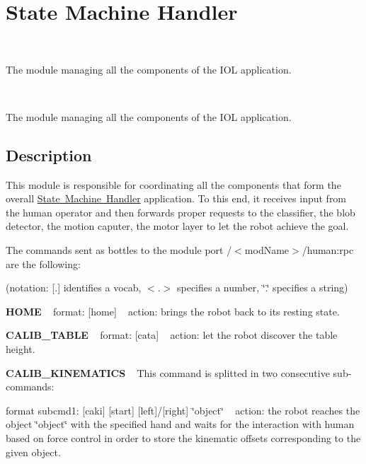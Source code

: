 \section{State Machine Handler}
\label{group__icub__iolStateMachineHandler}


~\newline


The module managing all the components of the I\+OL application.  


~\newline


The module managing all the components of the I\+OL application. 

\hypertarget{group__iolReachingCalibration_intro_sec}{}\subsection{Description}\label{group__iolReachingCalibration_intro_sec}
This module is responsible for coordinating all the components that form the overall \mbox{\hyperlink{group__icub__iolStateMachineHandler}{State Machine Handler}} application. To this end, it receives input from the human operator and then forwards proper requests to the classifier, the blob detector, the motion caputer, the motor layer to let the robot achieve the goal.

The commands sent as bottles to the module port /$<$mod\+Name$>$/human\+:rpc are the following\+:

(notation\+: \mbox{[}.\mbox{]} identifies a vocab, $<$.$>$ specifies a number, \char`\"{}.\char`\"{} specifies a string)

{\bfseries H\+O\+ME} ~\newline
format\+: \mbox{[}home\mbox{]} ~\newline
action\+: brings the robot back to its resting state.

{\bfseries C\+A\+L\+I\+B\+\_\+\+T\+A\+B\+LE} ~\newline
format\+: \mbox{[}cata\mbox{]} ~\newline
action\+: let the robot discover the table height.

{\bfseries C\+A\+L\+I\+B\+\_\+\+K\+I\+N\+E\+M\+A\+T\+I\+CS} ~\newline
This command is splitted in two consecutive sub-\/commands\+:

format subcmd1\+: \mbox{[}caki\mbox{]} \mbox{[}start\mbox{]} \mbox{[}left\mbox{]}/\mbox{[}right\mbox{]} \char`\"{}object\char`\"{} ~\newline
action\+: the robot reaches the object \char`\"{}object\char`\"{} with the specified hand and waits for the interaction with human based on force control in order to store the kinematic offsets corresponding to the given object.

